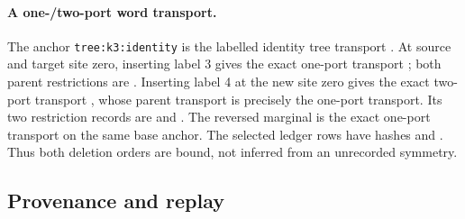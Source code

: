 \paragraph{A one-/two-port word transport.}
The anchor \texttt{tree:k3:identity} is the labelled identity tree
transport .  At source and target
site zero, inserting label 3 gives the exact one-port
transport ; both parent restrictions are
.  Inserting label
4 at the new site zero gives the exact two-port transport
, whose parent transport is precisely the
one-port transport.  Its two restriction records are
 and
.  The reversed marginal is
the exact one-port transport
on the same base anchor.  The selected ledger rows have hashes
 and
.  Thus both deletion orders are bound,
not inferred from an unrecorded symmetry.

\subsection{Provenance and replay}


